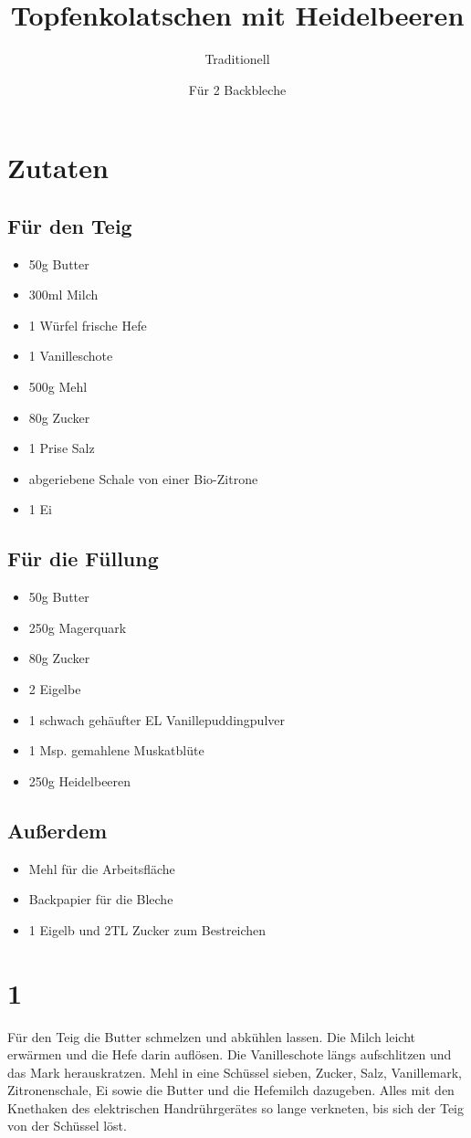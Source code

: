 \documentclass[twocolumn,11pt,a4paper,german]{article}
\title{\vspace{-35pt}Topfenkolatschen mit Heidelbeeren}
\author{Traditionell}
\date{Für 2 Backbleche}
\begin{document}
\maketitle
\section*{Zutaten}
\subsection*{Für den Teig}
\begin{itemize}
\item 50g Butter
\item 300ml Milch
\item 1 Würfel frische Hefe
\item 1 Vanilleschote
\item 500g Mehl
\item 80g Zucker
\item 1 Prise Salz
\item abgeriebene Schale von einer Bio-Zitrone
\item 1 Ei
\end{itemize}
\subsection*{Für die Füllung}
\begin{itemize}
\item 50g Butter
\item 250g Magerquark
\item 80g Zucker
\item 2 Eigelbe
\item 1 schwach gehäufter EL Vanillepuddingpulver
\item 1 Msp. gemahlene Muskatblüte
\item 250g Heidelbeeren
\end{itemize}
\subsection*{Außerdem}
\begin{itemize}
\item Mehl für die Arbeitsfläche
\item Backpapier für die Bleche
\item 1 Eigelb und 2TL Zucker zum Bestreichen
\end{itemize}
\section*{1}
Für den Teig die Butter schmelzen und abkühlen lassen. Die Milch leicht erwärmen
und die Hefe darin auflösen. Die Vanilleschote längs aufschlitzen und das Mark
herauskratzen. Mehl in eine Schüssel sieben, Zucker, Salz, Vanillemark,
Zitronenschale, Ei sowie die Butter und die Hefemilch dazugeben. Alles mit den
Knethaken des elektrischen Handrührgerätes so lange verkneten, bis sich der Teig
von der Schüssel löst.
\end{document}
